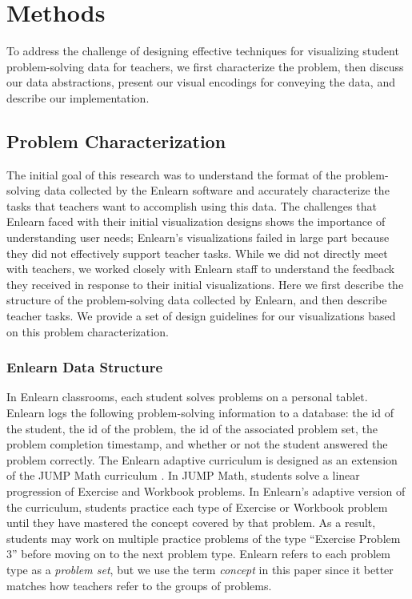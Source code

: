 \documentclass{sigchi}
\begin{document}
\section{Methods}
To address the challenge of designing effective techniques for visualizing student problem-solving data for teachers, we first characterize the problem, then discuss our data abstractions, present our visual encodings for conveying the data, and describe our implementation.


\subsection{Problem Characterization}
The initial goal of this research was to understand the format of the problem-solving data collected by the Enlearn software and accurately characterize the tasks that teachers want to accomplish using this data. The challenges that Enlearn faced with their initial visualization designs shows the importance of understanding user needs; Enlearn's visualizations failed in large part because they did not effectively support teacher tasks. While we did not directly meet with teachers, we worked closely with Enlearn staff to understand the feedback they received in response to their initial visualizations. Here we first describe the structure of the problem-solving data collected by Enlearn, and then describe teacher tasks. We provide a set of design guidelines for our visualizations based on this problem characterization.

\subsubsection{Enlearn Data Structure}
In Enlearn classrooms, each student solves problems on a personal tablet. Enlearn logs the following problem-solving information to a database: the id of the student, the id of the problem, the id of the associated problem set, the problem completion timestamp,  and whether or not the student answered the problem correctly. The Enlearn adaptive curriculum is designed as an extension of the JUMP Math curriculum \cite{JUMPMath}. In JUMP Math, students solve a linear progression of Exercise and Workbook problems. In Enlearn's adaptive version of the curriculum, students practice each type of Exercise or Workbook problem until they have mastered the concept covered by that problem. As a result, students may work on multiple practice problems of the type ``Exercise Problem 3'' before moving on to the next problem type. Enlearn refers to each problem type as a \emph{problem set}, but we use the term \emph{concept} in this paper since it better matches how teachers refer to the groups of problems.
\end{document}
